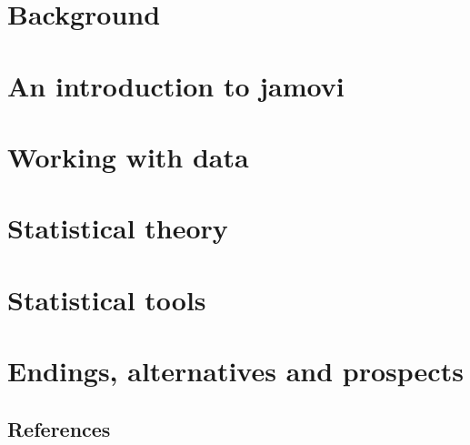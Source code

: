 




\pagestyle{plain}

\maketitle %



\tableofcontents
\clearpage



\setcounter{page}{1}


\part{Background}



\part{An introduction to jamovi}


\part{Working with data}




\part{Statistical theory}





\part{Statistical tools}




 
 

\part{Endings, alternatives and prospects}

 





\chapter{References}
\printbibliography[heading=none]


